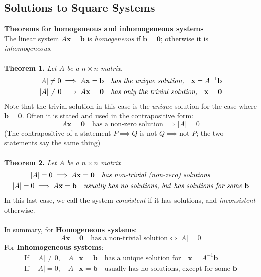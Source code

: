 \documentclass{report}
\begin{document}
\subsection{Solutions to Square Systems} %
\textbf{Theorems for homogeneous and inhomogeneous systems}\\
The linear system $A\mathbf{x=b}$ is \textit{homogeneous} if $\mathbf{b=0}$; otherwise 
it is \textit{inhomogeneous}.\\
\vspace{1mm}\\
\textbf{Theorem 1.} \textit{Let $A$ be a $n\times n$ matrix}.
\begin{align*}
|A|\neq0\implies A\mathbf{x=b}\quad\text{\textit{has the unique solution,}}
\quad\mathbf{x}=A^{-1}\mathbf{b}\\
|A|\neq0\implies A\mathbf{x=0}\quad\text{\textit{has only the trivial solution,}}
\quad\mathbf{x=0}\\
\end{align*}
Note that the trivial solution in this case is the \textit{unique} solution for the 
case where $\mathbf{b=0}$. Often it is stated and used in the contrapositive form:
\begin{equation*}
A\mathbf{x=0}\quad\text{has a non-zero solution}\implies|A|=0
\end{equation*} 
(The contrapositive of a statement $P\implies Q$ is not-$Q\implies$not-$P$; the two
statements say the same thing)\\
\vspace{1mm}\\
\textbf{Theorem 2.} \textit{Let $A$ be a $n\times n$ matrix}
\begin{align*}
|A|=0\implies A&\mathbf{x=0}\quad\text{\textit{has non-trivial (non-zero) solutions}}\\
|A|=0\implies A\mathbf{x=b}&\quad\text{\textit{usually has no solutions, but has solutions
for some $\mathbf{b}$}}
\end{align*}
In this last case, we call the system \textit{consistent} if it has solutions, 
and \textit{inconsistent} otherwise.\\
\vspace{1mm}\\
In summary, for \textbf{Homogeneous systems}:
\begin{equation*}
A\mathbf{x=0}\quad\text{has a non-trivial solution}\iff|A|=0
\end{equation*}
For \textbf{Inhomogeneous systems}:
\begin{align*}
\text{If}\quad|A|\neq0,\quad A&\mathbf{x=b}\quad\text{has a unique solution for}
\quad\mathbf{x}=A^{-1}\mathbf{b}\\
\text{If}\quad|A|=0,\quad A&\mathbf{x=b}\quad\text{usually has no solutions, 
except for some }\mathbf{b}
\end{align*}
\end{document}
